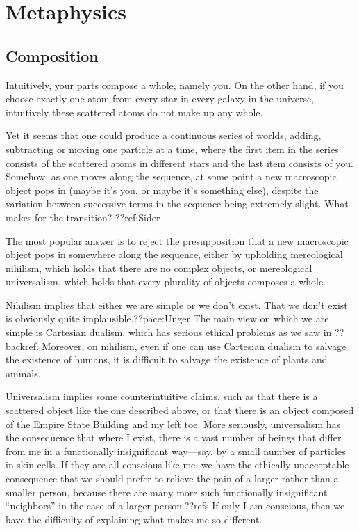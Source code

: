 \def\mychapter{IX}


\chapter{Metaphysics}\label{ch:metaphysics}
\section{Composition}
Intuitively, your parts compose a whole, namely you. On the other hand,
if you choose exactly one atom from every star in every galaxy in the universe,
intuitively these scattered atoms do not make up any whole.

Yet it seems that one could produce a continuous series of worlds, adding, subtracting or moving 
one particle at a time, where the first item in the series consists of the scattered
atoms in different stars and the last item consists of you. Somehow, as one moves
along the sequence, at some point a new macroscopic object pops in (maybe it's 
you, or maybe it's something else), despite the variation between successive terms
in the sequence being extremely slight. What makes for the transition? ??ref:Sider

The most popular answer is to reject the presupposition that a new macroscopic object
pops in somewhere along the sequence, either by upholding mereological nihilism, which holds that
there are no complex objects, or mereological universalism, which holds that every plurality of
objects composes a whole. 

Nihilism implies that either we are
simple or we don't exist. That we don't exist is obviously quite implausible.??pace:Unger 
The main view on which we are simple is Cartesian dualism, which has serious ethical problems 
as we saw in ??backref. Moreover, on nihilism, even if one can use Cartesian dualism to salvage
the existence of humans, it is difficult to salvage the existence of plants and animals.

Universalism implies some counterintuitive claims, such as that there is a scattered object
like the one described above, or that there is an object composed of the Empire State Building
and my left toe. More seriously, universalism has the consequence that where I exist, there
is a vast number of beings that differ from me in a functionally insignificant way---say, 
by a small number of particles in skin cells. If they are all conscious like me, we have the 
ethically unacceptable consequence that we should prefer to relieve the pain of a larger
rather than a smaller person, because there are many more such functionally insignificant 
``neighbors'' in the case of a larger person.??refs If only I am conscious, then we have the
difficulty of explaining what makes me so different.

